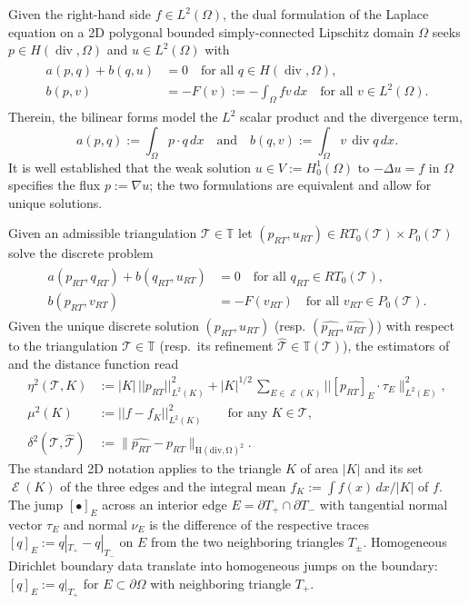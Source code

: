 \documentclass{siamltex1213}
\begin{document}
Given the right-hand side $f\in L^2(\Omega)$, the dual formulation of the Laplace equation 
on a 2D polygonal bounded simply-connected Lipschitz domain $\Omega$ 
seeks  $p\in H(\operatorname{div},\Omega)$ and $u\in L^2(\Omega)$ with 
\begin{align}\label{e:abstractmixed}
	\begin{aligned}
		a(p,q)+b(q,u)&=  0\quad\mbox{for all } q\in H(\operatorname{div},\Omega),  \\
		b(p,v)&=-F(v) := -\int_\Omega fv\, dx \quad\mbox{for all }v\in L^2(\Omega).
	\end{aligned}
\end{align}
Therein, the bilinear forms model the $L^2$ scalar product and the divergence term,
\begin{equation}
\label{e:bilinear}
a(p,q):=\int_\Omega p\cdot q\, dx\quad\text{and} \quad 
b(q,v):=\int_\Omega v\,\operatorname{div} q\, dx.
\end{equation}
It is well established that  the weak solution 
$u\in V:= H^1_0(\Omega)$ to $-\Delta u=f$  in $\Omega$ 
specifies the flux $p:=\nabla u$; the two formulations are equivalent and allow for unique solutions.

Given an admissible triangulation ${\mathcal{T}}\in{\mathbb T}$  let 
$(p_{RT},u_{RT})\in RT_0({\mathcal{T}})\times P_0({\mathcal{T}})$ solve the discrete problem 
\begin{align}\label{e:abstractmixedfem}
	\begin{aligned}
a(p_{RT},q_{RT})+b(q_{RT},u_{RT})&= 0\quad\mbox{for all } q_{RT}\in RT_0({\mathcal{T}}),  \\
	b(p_{RT},v_{RT})&=-F(v_{RT})  \quad\mbox{for all }v_{RT}\in P_0({\mathcal{T}}).
\end{aligned}
\end{align}
Given the unique discrete solution $(p_{RT},u_{RT})$ (resp. $({\widehat{p_{RT}}},{\widehat{u_{RT}}})$) with respect to the triangulation 
${\mathcal{T}}\in{\mathbb T}$ (resp.\ its refinement ${\hat{\mathcal{T}}}\in{\mathbb T}({\mathcal{T}})$),  the estimators  of \cite{ccdpas2015} 
and the distance function read
\begin{align*}
\eta^2({\mathcal{T}},K)&:= |K|\, || p_{RT} ||_{L^2(K)}^2+ |K|^{1/2}\, \sum_{E\in \operatorname{\mathcal{E}}(K)} ||[p_{RT}]_E\cdot\tau_E\|_{L^2(E)}^2,\\
\mu^2(K) & := ||f- f_K||_{L^2(K)}^2 \qquad\text{for any }K\in{\mathcal{T}} ,\\
\delta^2({\mathcal{T}},{\hat{\mathcal{T}}}) & := \| {\widehat{p_{RT}}}-p_{RT}\|_\operatorname{\mathrm H( div, \Omega )}^2. 
\end{align*} 
The standard 2D notation applies  to the triangle $K$ of area $|K|$ and its set $\operatorname{\mathcal{E}}(K)$ of the three edges and the integral mean  $f_K:=\int f(x)\, dx/|K|$ of $f$. The jump $[\bullet]_E$ across  an interior edge $E=\partial T_+\cap\partial T_-$
with tangential normal vector $\tau_E$ and normal $\nu_E$ 
is the difference of the respective traces 
$ [q]_E:= q|_{T_+}-q|_{T_-}$ on $E$ from the two neighboring triangles $T_\pm$. Homogeneous 
Dirichlet boundary data translate into homogeneous jumps on the boundary:
 $ [q]_E:= q|_{T_+}$ for $E\subset\partial\Omega$ with neighboring triangle $T_+$. 
 
\end{document}
